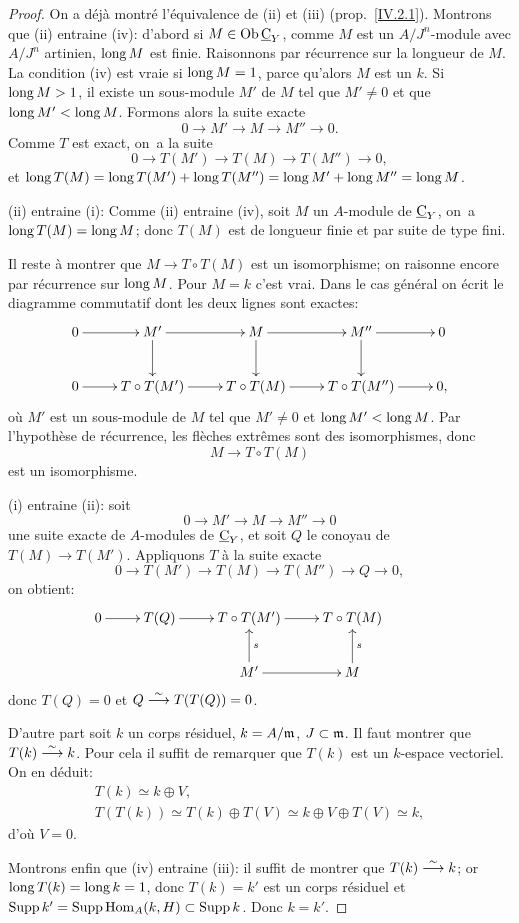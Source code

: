 \begin{proof}
On a d\'ej\`a montr\'e l'\'equivalence de (ii) et (iii) (prop.\, \ref{IV.2.1}). Montrons que (ii) entraine (iv): d'abord si $M\in \operatorname{Ob} \underline{\mathrm{C}}_{Y}$, comme $M$ est un $A/J^{n}$-module avec $A/J^{n}$ artinien, $\operatorname{long} M$ est finie. Raisonnons par r\'ecurrence sur la longueur de $M$. La condition (iv) est vraie si $\operatorname{long} M=1$, parce qu'alors $M$ est un $k$. Si $\operatorname{long} M>1$, il existe un sous-module $M'$ de $M$ tel que $M'\neq 0$ et que $\operatorname{long} M'<\operatorname{long} M$. Formons alors la suite exacte
$$
0\to M'\to M\to M''\to 0.
$$
Comme $T$ est exact, on~a la suite
$$
0\to T(M')\to T(M)\to T(M'')\to 0,
$$
et $\operatorname{long} T(M)=\operatorname{long} T(M')+\operatorname{long} T(M'')=\operatorname{long} M'+\operatorname{long} M''=\operatorname{long} M$.

(ii) entraine (i): Comme (ii) entraine (iv), soit $M$ un $A$-module de $\underline{\mathrm{C}}_{Y}$, on~a $\operatorname{long} T(M)=\operatorname{long} M$; donc $T(M)$ est de longueur finie et par suite de type fini.

Il reste \`a montrer que $M\to T\circ T(M)$ est un isomorphisme; on raisonne encore par r\'ecurrence sur $\operatorname{long} M$. Pour $M=k$ c'est vrai. Dans le cas g\'en\'eral on \'ecrit le diagramme commutatif dont les deux lignes sont exactes:
$$
\xymatrix{ 0\ar[r]&M'\ar[r]\ar[d]&M\ar[r]\ar[d]&M''\ar[r]\ar[d]&0\\
0\ar[r]& T\circ T(M')\ar[r]& T\circ T(M)\ar[r]& T\circ T(M'')\ar[r]&0, }
$$
o\`u $M'$ est un sous-module de $M$ tel que $M'\neq 0$ et $\operatorname{long} M'<\operatorname{long} M$. Par l'hypoth\`ese de r\'ecurrence, les fl\`eches extr\^emes sont des isomorphismes, donc
$$
M\to T\circ T(M)
$$
est un isomorphisme.

(i) entraine (ii): soit
$$
0\to M'\to M\to M''\to 0
$$
une suite exacte de $A$-modules de $\underline{\mathrm{C}}_{Y}$, et soit $Q$ le conoyau de $T(M)\to T(M')$. Appliquons $T$ \`a la suite exacte
$$
0\to T(M')\to T(M)\to T(M'')\to Q \to 0,
$$
on obtient:
$$
\xymatrix{
0\ar[r]&T(Q)\ar[r]&T\circ T(M')\ar[r]&T\circ T(M)&\\
& &M'\ar_{s}[u]\ar[r]&M\ar_{s}[u],
}
$$
donc $T(Q)=0$ et $Q\overset{\sim}{\longrightarrow} T(T(Q))=0$.

D'autre part soit $k$ un corps r\'esiduel, $k=A/\mathfrak{m}$, $J\subset \mathfrak{m}$. Il faut montrer que $T(k)\overset{\sim}{\longrightarrow} k$. Pour cela il suffit de remarquer que $T(k)$ est un $k$-espace vectoriel. On en d\'eduit:
\begin{gather*}
T(k)\simeq k\oplus V,\\
T(T(k))\simeq T(k)\oplus T(V)\simeq k\oplus V\oplus T(V)\simeq k,
\end{gather*}
d'o\`u $V=0$.

Montrons enfin que (iv) entraine (iii): il suffit de montrer que $T(k)\overset{\sim}{\longrightarrow} k$; or $\operatorname{long} T(k)= \operatorname{long} k=1$, donc $T(k)=k'$ est un corps r\'esiduel et $\operatorname{Supp} k'= \operatorname{Supp} \operatorname{Hom}_{A}(k, H)\subset \operatorname{Supp} k$. Donc $k=k'$.
\skipqed
\end{proof}

